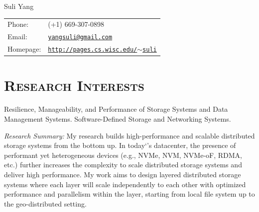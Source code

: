 \documentclass[10pt, letterpaper]{article}
\def\name{Suli Yang}
\begin{document}
{\huge \name}

\bigskip

\begin{minipage}{0.45\linewidth}
\hypersetup{urlcolor=black}
\begin{tabular}{ll}
  Phone: & (+1) 669-307-0898\\
  Email: & \href{mailto:yangsuli@gmail.com}{\tt yangsuli@gmail.com}\\
  Homepage: & \href{http://pages.cs.wisc.edu/~suli}
  	{\tt http://pages.cs.wisc.edu/$\sim$suli}
\end{tabular}
\end{minipage}

\section*{\textsc{Research Interests}}

Resilience, Manageability, and Performance of Storage Systems and Data Management Systems.
Software-Defined Storage and Networking Systems.
\fi

\vspace{0.15cm}
\noindent
{\textit{Research Summary:}} 
    My research builds high-performance and scalable distributed storage systems from the bottom up. 
    In today`’s datacenter, the presence of performant yet heterogeneous devices (e.g., NVMe, NVM, NVMe-oF, RDMA, etc.) further increases the complexity to scale distributed storage systems and deliver high performance. My work aims to design layered distributed storage systems where each layer will scale independently to each other with optimized performance and parallelism within the layer, starting from local file system up to the geo-distributed setting. 
    
\fi
\end{document}
